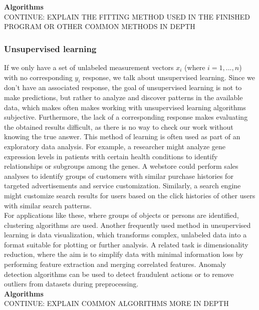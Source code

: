 \documentclass[a4paper,oneside,onecolumn,12pt]{LegrandOrangeBook}
\begin{document}
			\textbf{Algorithms}\\
			CONTINUE: EXPLAIN THE FITTING METHOD USED IN THE FINISHED PROGRAM OR OTHER COMMON METHODS IN DEPTH\\

			\subsubsection{Unsupervised learning}
			If we only have a set of unlabeled measurement vectors $x_i$ (where $i = 1, ..., n$) with no corresponding $y_i$ response, we talk about unsupervised learning. Since we don't have an associated response, the goal of unsupervised learning is not to make predictions, but rather to analyze and discover patterns in the available data, which makes often makes working with unsupervised learning algorithms subjective. Furthermore, the lack of a corresponding response makes evaluating the obtained results difficult, as there is no way to check our work without knowing the true answer. This method of learning is often used as part of an exploratory data analysis. For example, a researcher might analyze gene expression levels in patients with certain health conditions to identify relationships or subgroups among the genes. A webstore could perform sales analyses to identify groups of customers with similar purchase histories for targeted advertisements and service customization. Similarly, a search engine might customize search results for users based on the click histories of other users with similar search patterns. \cite{AISL} \\
			For applications like these, where groups of objects or persons are identified, clustering algorithms are used. Another frequently used method in unsupervised learning is data visualization, which transforms complex, unlabeled data into a format suitable for plotting or further analysis. A related task is dimensionality reduction, where the aim is to simplify data with minimal information loss by performing feature extraction and merging correlated features. Anomaly detection algorithms can be used to detect fraudulent actions or to remove outliers from datasets during preprocessing. \cite{HMLSKT}\\

			\textbf{Algorithms}\\
			CONTINUE: EXPLAIN COMMON ALGORITHMS MORE IN DEPTH\\
\end{document}
